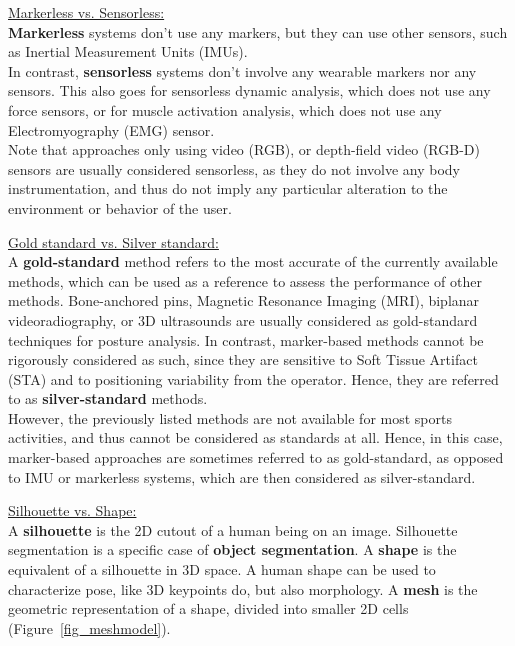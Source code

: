 \vspace*{0.5cm}

\noindent\underline{Markerless vs. Sensorless:}\\
\textbf{Markerless} systems don't use any markers, but they can use other sensors, such as Inertial Measurement Units (IMUs). \\
In contrast, \textbf{sensorless} systems don't involve any wearable markers nor any sensors. This also goes for sensorless dynamic analysis, which does not use any force sensors, or for muscle activation analysis, which does not use any Electromyography (EMG) sensor. \\
Note that approaches only using video (RGB), or depth-field video (RGB-D) sensors are usually considered sensorless, as they do not involve any body instrumentation, and thus do not imply any particular alteration to the environment or behavior of the user.

\vspace*{0.5cm}

\noindent\underline{Gold standard vs. Silver standard:}\\
A \textbf{gold-standard} method refers to the most accurate of the currently available methods, which can be used as a reference to assess the performance of other methods. Bone-anchored pins, Magnetic Resonance Imaging (MRI), biplanar videoradiography, or 3D ultrasounds are usually considered as gold-standard techniques for posture analysis. In contrast, marker-based methods cannot be rigorously considered as such, since they are sensitive to Soft Tissue Artifact (STA) and to positioning variability from the operator. Hence, they are referred to as \textbf{silver-standard} methods. \\
However, the previously listed methods are not available for most sports activities, and thus cannot be considered as standards at all. Hence, in this case, marker-based approaches are sometimes referred to as gold-standard, as opposed to IMU or markerless systems, which are then considered as silver-standard.

\vspace*{0.5cm}

\noindent\underline{Silhouette vs. Shape:}\\
A \textbf{silhouette} is the 2D cutout of a human being on an image. Silhouette segmentation is a specific case of \textbf{object segmentation}. 
A \textbf{shape} is the equivalent of a silhouette in 3D space. A human shape can be used to characterize pose, like 3D keypoints do, but also morphology. A \textbf{mesh} is the geometric representation of a shape, divided into smaller 2D cells (Figure~\ref{fig_meshmodel}).

